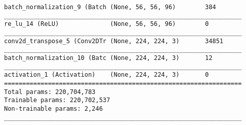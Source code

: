 \begin{lstlisting}[caption={AlexNet-VAE Decoder},captionpos=b,basicstyle=\tiny, label={lst:alexnet-vae-decoder}]
batch_normalization_9 (Batch (None, 56, 56, 96)        384
_________________________________________________________________
re_lu_14 (ReLU)              (None, 56, 56, 96)        0
_________________________________________________________________
conv2d_transpose_5 (Conv2DTr (None, 224, 224, 3)       34851
_________________________________________________________________
batch_normalization_10 (Batc (None, 224, 224, 3)       12
_________________________________________________________________
activation_1 (Activation)    (None, 224, 224, 3)       0
=================================================================
Total params: 220,704,783
Trainable params: 220,702,537
Non-trainable params: 2,246
_________________________________________________________________
\end{lstlisting}